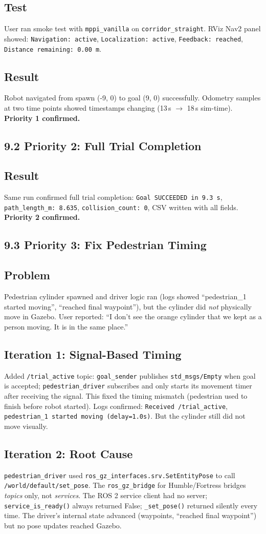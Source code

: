 \documentclass[11pt]{article}
\newcommand{\logentry}[1]{\subsection*{#1}}
\begin{document}
\logentry{Test}
User ran smoke test with \texttt{mppi\_vanilla} on \texttt{corridor\_straight}.
RViz Nav2 panel showed: \texttt{Navigation: active}, \texttt{Localization: active},
\texttt{Feedback: reached}, \texttt{Distance remaining: 0.00\,m}.

\logentry{Result}
Robot navigated from spawn (-9, 0) to goal (9, 0) successfully. Odometry samples
at two time points showed timestamps changing (13\,s $\to$ 18\,s sim-time).
\textbf{Priority 1 confirmed.}


\subsection*{9.2 Priority 2: Full Trial Completion}

\logentry{Result}
Same run confirmed full trial completion: \texttt{Goal SUCCEEDED in 9.3\,s},
\texttt{path\_length\_m: 8.635}, \texttt{collision\_count: 0}, CSV written with
all fields. \textbf{Priority 2 confirmed.}


\subsection*{9.3 Priority 3: Fix Pedestrian Timing}

\logentry{Problem}
Pedestrian cylinder spawned and driver logic ran (logs showed ``pedestrian\_1
started moving'', ``reached final waypoint''), but the cylinder did \emph{not}
physically move in Gazebo. User reported: ``I don't see the orange cylinder
that we kept as a person moving. It is in the same place.''

\logentry{Iteration 1: Signal-Based Timing}
Added \texttt{/trial\_active} topic: \texttt{goal\_sender} publishes
\texttt{std\_msgs/Empty} when goal is accepted; \texttt{pedestrian\_driver}
subscribes and only starts its movement timer after receiving the signal.
This fixed the timing mismatch (pedestrian used to finish before robot started).
Logs confirmed: \texttt{Received /trial\_active}, \texttt{pedestrian\_1 started
moving (delay=1.0s)}. But the cylinder still did not move visually.

\logentry{Iteration 2: Root Cause}
\texttt{pedestrian\_driver} used \texttt{ros\_gz\_interfaces.srv.SetEntityPose}
to call \texttt{/world/default/set\_pose}. The \texttt{ros\_gz\_bridge} for
Humble/Fortress bridges \emph{topics} only, not \emph{services}. The ROS 2
service client had no server; \texttt{service\_is\_ready()} always returned
False; \texttt{\_set\_pose()} returned silently every time. The driver's
internal state advanced (waypoints, ``reached final waypoint'') but no pose
updates reached Gazebo.
\end{document}
